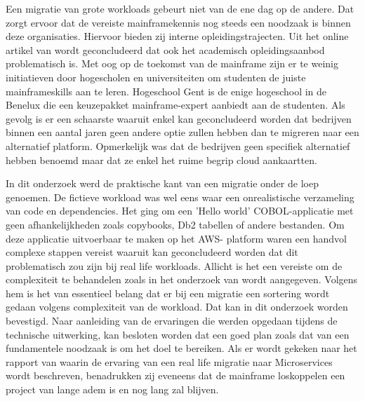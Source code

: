 Een migratie van grote workloads gebeurt niet van de ene dag op de andere. Dat zorgt ervoor dat de vereiste mainframekennis nog steeds een noodzaak is binnen deze organisaties. Hiervoor bieden zij interne opleidingstrajecten. Uit het online artikel van \textcite{2020} wordt geconcludeerd dat ook het academisch opleidingsaanbod problematisch is. Met oog op de toekomst van de mainframe zijn er te weinig initiatieven door hogescholen en universiteiten om studenten de juiste mainframeskills aan te leren. Hogeschool Gent is de enige hogeschool in de Benelux die een keuzepakket mainframe-expert aanbiedt aan de studenten. Als gevolg is er een schaarste waaruit enkel kan geconcludeerd worden dat bedrijven binnen een aantal jaren geen andere optie zullen hebben dan te migreren naar een alternatief platform. Opmerkelijk was dat de bedrijven geen specifiek alternatief hebben benoemd maar dat ze enkel het ruime begrip cloud aankaartten. 

In dit onderzoek werd de praktische kant van een migratie onder de loep genoemen. De fictieve workload was wel eens waar een onrealistische verzameling van code en dependencies. Het ging om een 'Hello world' COBOL-applicatie met geen afhankelijkheden zoals copybooks, Db2 tabellen of andere bestanden. Om deze applicatie uitvoerbaar te maken op het AWS- platform waren een handvol complexe stappen vereist waaruit kan geconcludeerd worden dat dit problematisch zou zijn bij real life workloads. Allicht is het een vereiste om de complexiteit te behandelen zoals in het onderzoek van \textcite{Orban2016} wordt aangegeven. Volgens hem is het van essentieel belang dat er bij een migratie een sortering wordt gedaan volgens complexiteit van de workload. Dat kan in dit onderzoek worden bevestigd. Naar aanleiding van de ervaringen die werden opgedaan tijdens de technische uitwerking, kan besloten worden dat een goed plan zoals dat van \textcite{Marble2017} een fundamentele noodzaak is om het doel te bereiken. Als er wordt gekeken naar het rapport van \textcite{Bucchiarone2018} waarin de ervaring van een real life migratie naar Microservices wordt beschreven, benadrukken zij eveneens dat de mainframe loskoppelen een project van lange adem is en nog lang zal blijven. 

